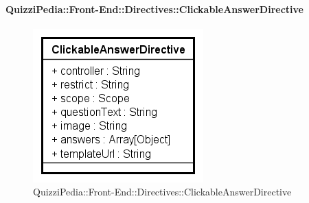 	\paragraph{QuizziPedia::Front-End::Directives::ClickableAnswerDirective}
		
		\label{QuizziPedia::Front-End::Directives::ClickableAnswerDirective}
		
		\begin{figure}[ht]
			\centering
			\includegraphics[scale=0.80,keepaspectratio]{UML/Classi/Front-End/QuizziPedia_Front-end_Templates_ClickableAnswerTemplate.png}
			\caption{QuizziPedia::Front-End::Directives::ClickableAnswerDirective}
		\end{figure} \FloatBarrier
		
